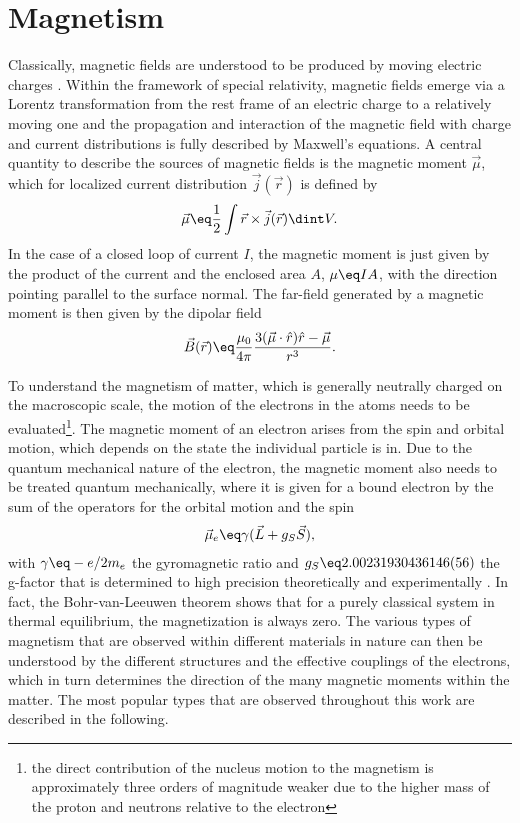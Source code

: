 \documentclass[\main/dresen_thesis.tex]{subfiles}
\begin{document}
\section{Magnetism}\label{ch:theoreticalBackground:magnetism}

  Classically, magnetic fields are understood to be produced by moving electric charges \cite{Jackson_1999_Class, Blundell_2001_Magne}.
  Within the framework of special relativity, magnetic fields emerge via a Lorentz transformation from the rest frame of an electric charge to a relatively moving one and the propagation and interaction of the magnetic field with charge and current distributions is fully described by Maxwell's equations.
  A central quantity to describe the sources of magnetic fields is the magnetic moment $\vec{\mu}$, which for localized current distribution $\vec{j}(\vec{r})$ is defined by
  \begin{align}
    \vec{\mu} \eq \frac{1}{2} \int \vec{r} \times \vec{j}(\vec{r}) \dint V .
  \end{align}
  In the case of a closed loop of current $I$, the magnetic moment is just given by the product of the current and the enclosed area $A$, $\mu \eq I A$, with the direction pointing parallel to the surface normal.
  The far-field generated by a magnetic moment is then given by the dipolar field
  \begin{align}
    \vec{B} (\vec{r}) \eq \frac{\mu_0}{4 \pi} \frac{3(\vec{\mu} \cdot \hat{r})\hat{r} - \vec{\mu}}{r^3}.
  \end{align}

  To understand the magnetism of matter, which is generally neutrally charged on the macroscopic scale, the motion of the electrons in the atoms needs to be evaluated\footnote{the direct contribution of the nucleus motion to the magnetism is approximately three orders of magnitude weaker due to the higher mass of the proton and neutrons relative to the electron}.
  The magnetic moment of an electron arises from the spin and orbital motion, which depends on the state the individual particle is in.
  Due to the quantum mechanical nature of the electron, the magnetic moment also needs to be treated quantum mechanically, where it is given for a bound electron by the sum of the operators for the orbital motion and the spin \cite{Coey_2010_Magne}
  \begin{align}
    \vec{\mu}_e \eq \gamma (\vec{L} + g_S \vec{S}),
  \end{align}
  with $\gamma \eq -e/2m_e$ the gyromagnetic ratio and $g_S \eq 2.00231930436146(56)$ the g-factor that is determined to high precision theoretically and experimentally \cite{Aoyama_2012_Tenth, Hanneke_2011_Cavit}.
  In fact, the Bohr-van-Leeuwen theorem shows that for a purely classical system in thermal equilibrium, the magnetization is always zero.
  The various types of magnetism that are observed within different materials in nature can then be understood by the different structures and the effective couplings of the electrons, which in turn determines the direction of the many magnetic moments within the matter.
  The most popular types that are observed throughout this work are described in the following.
\end{document}
